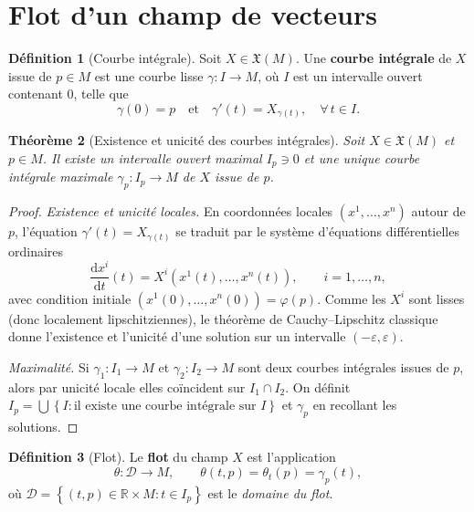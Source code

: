 \documentclass[12pt,a4paper,openany]{book}
\theoremstyle{definition}
\newtheorem{definition}{Définition}[chapter]
\theoremstyle{plain}
\newtheorem{theoreme}[definition]{Théorème}
\theoremstyle{remark}
\newcommand{\R}{\mathbb{R}}
\newcommand{\dd}{\mathrm{d}}
\newcommand{\set}[1]{\left\{#1\right\}}
\begin{document}
\section{Flot d'un champ de vecteurs}\label{sec:flot}

\begin{definition}[Courbe intégrale]\label{def:courbe-integrale}
Soit $X \in \mathfrak{X}(M)$. Une \textbf{courbe intégrale}
de $X$ issue de $p \in M$ est une courbe lisse $\gamma : I \to M$, où $I$ est un
intervalle ouvert contenant $0$, telle que
\[
  \gamma(0) = p \quad \text{et} \quad \gamma'(t) = X_{\gamma(t)}, \quad \forall\, t \in I.
\]
\end{definition}

\begin{theoreme}[Existence et unicité des courbes intégrales]\label{thm:cauchy-lipschitz}
Soit $X \in \mathfrak{X}(M)$ et $p \in M$. Il existe un intervalle ouvert maximal
$I_p \ni 0$ et une unique courbe intégrale maximale $\gamma_p : I_p \to M$ de $X$
issue de $p$.
\end{theoreme}

\begin{proof}
\emph{Existence et unicité locales.}
En coordonnées locales $(x^1, \ldots, x^n)$ autour de $p$, l'équation $\gamma'(t) = X_{\gamma(t)}$
se traduit par le système d'équations différentielles ordinaires
\[
  \frac{\dd x^i}{\dd t}(t) = X^i(x^1(t), \ldots, x^n(t)), \qquad i = 1, \ldots, n,
\]
avec condition initiale $(x^1(0), \ldots, x^n(0)) = \varphi(p)$.
Comme les $X^i$ sont lisses (donc localement lipschitziennes), le théorème de
Cauchy--Lipschitz classique donne l'existence et l'unicité d'une solution sur un
intervalle $(-\varepsilon, \varepsilon)$.

\emph{Maximalité.}
Si $\gamma_1 : I_1 \to M$ et $\gamma_2 : I_2 \to M$ sont deux courbes intégrales
issues de $p$, alors par unicité locale elles coïncident sur $I_1 \cap I_2$.
On définit $I_p = \bigcup \set{I : \text{il existe une courbe intégrale sur } I}$
et $\gamma_p$ en recollant les solutions.
\end{proof}

\begin{definition}[Flot]\label{def:flot}
Le \textbf{flot} du champ $X$ est l'application
\[
  \theta : \mathcal{D} \longrightarrow M, \qquad \theta(t, p) = \theta_t(p) = \gamma_p(t),
\]
où $\mathcal{D} = \set{(t, p) \in \R \times M : t \in I_p}$ est le \emph{domaine du flot}.
\end{definition}
\end{document}
